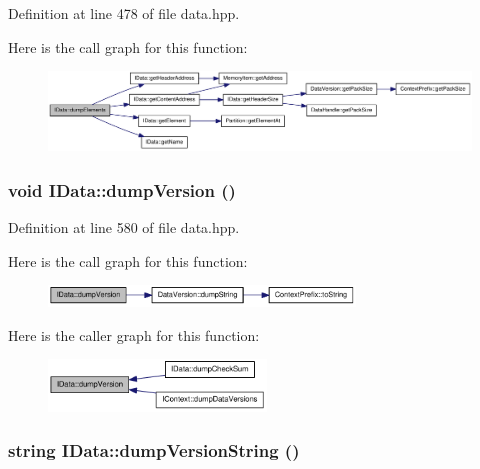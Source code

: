 Definition at line 478 of file data.hpp.

Here is the call graph for this function:\nopagebreak
\begin{figure}[H]
\begin{center}
\leavevmode
\includegraphics[width=415pt]{class_i_data_a2e42247007317b7451d50eb562a8ead1_cgraph}
\end{center}
\end{figure}
\hypertarget{class_i_data_a63c73bb8fa3a68e744b1fcad38508f0c}{
\subsubsection[{dumpVersion}]{\setlength{\rightskip}{0pt plus 5cm}void IData::dumpVersion ()}}
\label{class_i_data_a63c73bb8fa3a68e744b1fcad38508f0c}


Definition at line 580 of file data.hpp.

Here is the call graph for this function:\nopagebreak
\begin{figure}[H]
\begin{center}
\leavevmode
\includegraphics[width=231pt]{class_i_data_a63c73bb8fa3a68e744b1fcad38508f0c_cgraph}
\end{center}
\end{figure}


Here is the caller graph for this function:\nopagebreak
\begin{figure}[H]
\begin{center}
\leavevmode
\includegraphics[width=164pt]{class_i_data_a63c73bb8fa3a68e744b1fcad38508f0c_icgraph}
\end{center}
\end{figure}
\hypertarget{class_i_data_ae7530342c87faddc0e0042990b15dcc5}{
\subsubsection[{dumpVersionString}]{\setlength{\rightskip}{0pt plus 5cm}string IData::dumpVersionString ()}}
\label{class_i_data_ae7530342c87faddc0e0042990b15dcc5}


